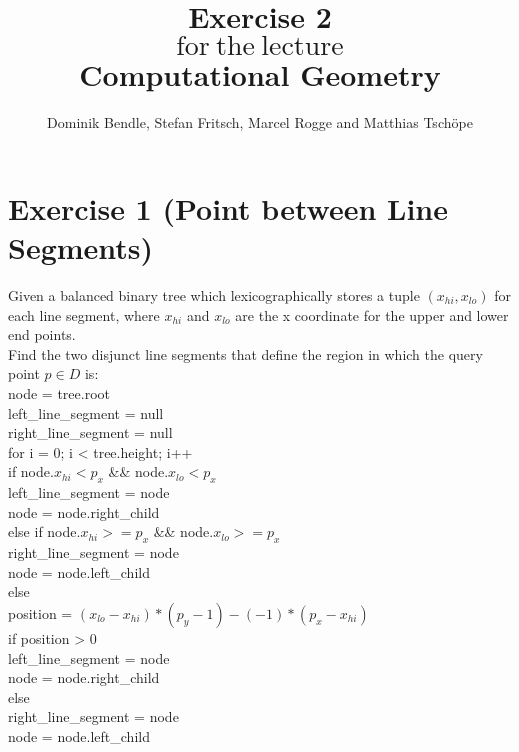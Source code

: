 \documentclass[english, fontsize=12pt, paper=a4, twoside=false, draft=true, pagesize=auto, version=last, DIV=16]{scrartcl}
\theoremstyle{break}
\begin{document}
\title{
\vspace*{-10mm}
Exercise 2 \\[-3pt]
{\Large $\mathrm{for \ the \ lecture}$} \\[-3pt]
{\LARGE \textbf{Computational Geometry}}
}
\author{Dominik Bendle, Stefan Fritsch, Marcel Rogge and Matthias Tschöpe}
\maketitle
\vspace*{-10mm}

\section*{Exercise 1 (Point between Line Segments)}
Given a balanced binary tree which lexicographically stores a tuple $(x_{hi}, x_{lo})$ for each line segment, where $x_{hi}$ and $x_{lo}$ are the x coordinate for the upper and lower end points.\\
Find the two disjunct line segments that define the region in which the query point $p \in D$ is:\\

node = tree.root\\
left\_line\_segment = null\\
right\_line\_segment = null\\

for i = 0;  i < tree.height; i++\\
\hspace*{10mm}if node.$x_{hi} < p_x$ \&\& node.$x_{lo} < p_x$\\
\hspace*{20mm}left\_line\_segment = node\\
\hspace*{20mm}node = node.right\_child\\
\hspace*{10mm}else if node.$x_{hi} >= p_x$ \&\& node.$x_{lo} >= p_x$\\
\hspace*{20mm}right\_line\_segment = node\\
\hspace*{20mm}node = node.left\_child\\
\hspace*{10mm}else\\
\hspace*{20mm}position = $(x_{lo} - x_{hi}) * (p_y - 1) - (-1) * (p_x - x_{hi})$\\
\hspace*{20mm}if position > 0\\
\hspace*{30mm}left\_line\_segment = node\\
\hspace*{30mm}node = node.right\_child\\
\hspace*{20mm}else\\
\hspace*{30mm}right\_line\_segment = node\\
\hspace*{30mm}node = node.left\_child\\
\end{document}
